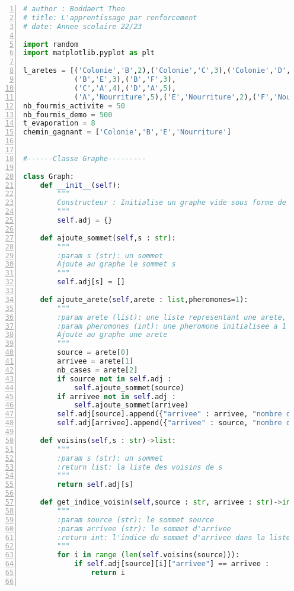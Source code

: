\documentclass[
12pt,
french,
]{article}
\begin{document}
\begin{lstlisting}[language=Python, numbers=left, label=colonies_fourmis]
# author : Boddaert Theo
# title: L'apprentissage par renforcement
# date: Annee scolaire 22/23

import random
import matplotlib.pyplot as plt

l_aretes = [('Colonie','B',2),('Colonie','C',3),('Colonie','D',4),
            ('B','E',3),('B','F',3),
            ('C','A',4),('D','A',5),
            ('A','Nourriture',5),('E','Nourriture',2),('F','Nourriture',8)]
nb_fourmis_activite = 50
nb_fourmis_demo = 500
t_evaporation = 8
chemin_gagnant = ['Colonie','B','E','Nourriture']


#------Classe Graphe---------

class Graph:
    def __init__(self):
        """
        Constructeur : Initialise un graphe vide sous forme de liste d'adjacence
        """
        self.adj = {}

    def ajoute_sommet(self,s : str):
        """
        :param s (str): un sommet
        Ajoute au graphe le sommet s
        """
        self.adj[s] = []

    def ajoute_arete(self,arete : list,pheromones=1):
        """
        :param arete (list): une liste representant une arete, elle comprend une source, une arrivee et un nombre de case
        :param pheromones (int): une pheromone initialisee a 1
        Ajoute au graphe une arete
        """
        source = arete[0]
        arrivee = arete[1]
        nb_cases = arete[2]
        if source not in self.adj :
            self.ajoute_sommet(source)
        if arrivee not in self.adj :
            self.ajoute_sommet(arrivee)
        self.adj[source].append({"arrivee" : arrivee, "nombre de case" : nb_cases, "pheromones" : pheromones})
        self.adj[arrivee].append({"arrivee" : source, "nombre de case" : nb_cases, "pheromones" : pheromones})

    def voisins(self,s : str)->list:
        """
        :param s (str): un sommet
        :return list: la liste des voisins de s
        """
        return self.adj[s]

    def get_indice_voisin(self,source : str, arrivee : str)->int:
        """
        :param source (str): le sommet source
        :param arrivee (str): le sommet d'arrivee
        :return int: l'indice du sommet d'arrivee dans la liste des voisins du sommet source
        """
        for i in range (len(self.voisins(source))):
            if self.adj[source][i]["arrivee"] == arrivee :
                return i


\end{lstlisting}
\end{document}
